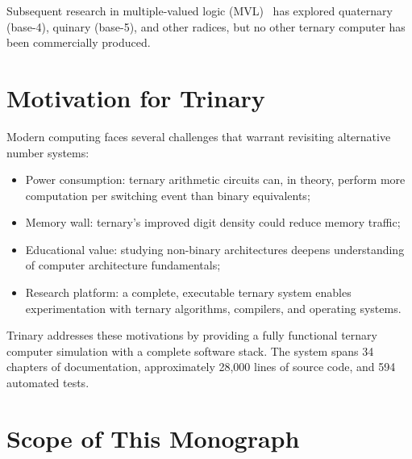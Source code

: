 \documentclass[12pt,a4paper,twoside]{book}
\theoremstyle{trinarytheorem}
\theoremstyle{trinarydefinition}
\begin{document}
Subsequent research in multiple-valued logic (MVL)~\cite{smith1997mvl} has explored
quaternary (base-4), quinary (base-5), and other radices, but no other ternary computer
has been commercially produced.

\section{Motivation for Trinary}

Modern computing faces several challenges that warrant revisiting alternative number
systems:
\begin{itemize}
    \item Power consumption: ternary arithmetic circuits can, in theory, perform more
          computation per switching event than binary equivalents;
    \item Memory wall: ternary's improved digit density could reduce memory traffic;
    \item Educational value: studying non-binary architectures deepens understanding of
          computer architecture fundamentals;
    \item Research platform: a complete, executable ternary system enables experimentation
          with ternary algorithms, compilers, and operating systems.
\end{itemize}

Trinary addresses these motivations by providing a fully functional ternary computer
simulation with a complete software stack. The system spans 34 chapters of
documentation, approximately 28,000 lines of source code, and 594 automated tests.

\section{Scope of This Monograph}
\end{document}
